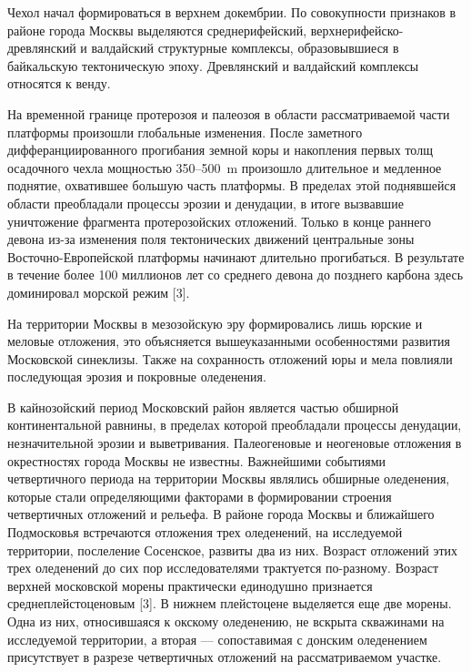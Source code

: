 Чехол начал формироваться в верхнем докембрии. По совокупности 
признаков в районе города Москвы выделяются среднерифейский, верхнерифейско-древлянский 
и валдайский структурные комплексы, образовывшиеся в байкальскую тектоническую эпоху. 
Древлянский и валдайский комплексы относятся к венду.

На временной границе протерозоя и палеозоя в области рассматриваемой части платформы 
произошли глобальные изменения. После заметного 
дифферанциированного прогибания земной коры и накопления первых толщ осадочного чехла
мощностью 350--500~\si{\meter} произошло длительное и медленное поднятие, охватившее
большую часть платформы. В пределах этой поднявшейся области преобладали процессы 
эрозии и денудации, в итоге вызвавшие уничтожение фрагмента протерозойских отложений. 
Только в конце раннего девона из-за изменения поля тектонических движений центральные 
зоны Восточно-Европейской платформы
начинают длительно прогибаться.
В результате в течение более 100 миллионов лет 
со среднего девона до позднего карбона здесь доминировал морской режим [3].

На территории Москвы в мезозойскую эру формировались лишь юрские и меловые отложения, это объясняется 
вышеуказанными особенностями развития Московской синеклизы. Также на сохранность 
отложений юры и мела повлияли последующая эрозия и покровные оледенения.

В кайнозойский период Московский район является частью обширной континентальной равнины,
в пределах которой преобладали процессы денудации, незначительной эрозии и выветривания.
Палеогеновые и неогеновые отложения в окрестностях города Москвы не известны.
Важнейшими событиями четвертичного периода на территории Москвы являлись обширные оледенения, 
которые стали определяющими факторами в формировании 
строения четвертичных отложений и рельефа.
В районе города Москвы и ближайшего Подмосковья встречаются отложения трех оледенений, на исследуемой территории,
послеление Сосенское, развиты два из них. 
Возраст отложений этих трех оледенений до сих пор исследователями трактуется по-разному.
Возраст верхней московской морены практически единодушно признается среднеплейстоценовым [3]. 
В нижнем плейстоцене выделяется еще две морены.
Одна из них, относившаяся к окскому оледенению, не вскрыта скважинами на исследуемой территории, 
а вторая --- сопоставимая с донским оледенением присутствует в разрезе четвертичных отложений на рассматриваемом участке.

